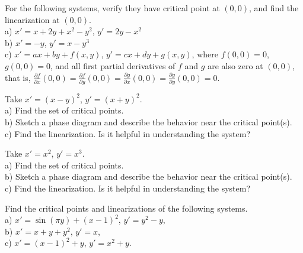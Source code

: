 \begin{exercise}
For the following systems, verify they have critical point at $(0,0)$,
and find the linearization at $(0,0)$.\\
a) $x'=x+2y+x^2-y^2$, $y'=2y-x^2$\\
b) $x'=-y$, $y'=x-y^3$\\
c) $x'=ax+by+f(x,y)$, $y'=cx+dy+g(x,y)$, where
$f(0,0) = 0$,
$g(0,0) = 0$, and all first partial derivatives of $f$ and $g$ are
also zero at $(0,0)$, that is,
$\frac{\partial f}{\partial x}(0,0) = 
\frac{\partial f}{\partial y}(0,0) = 
\frac{\partial g}{\partial x}(0,0) = 
\frac{\partial g}{\partial y}(0,0) = 0$.
\end{exercise}

\begin{exercise}
Take $x'=(x-y)^2$, $y'=(x+y)^2$. \\
a) Find the set of critical points. \\
b) Sketch a phase diagram and describe the behavior near the critical
point(s). \\
c) Find the linearization.  Is it helpful in understanding the system?
\end{exercise}

\begin{exercise}
Take $x'=x^2$, $y'=x^3$. \\
a) Find the set of critical points. \\
b) Sketch a phase diagram and describe the behavior near the critical
point(s). \\
c) Find the linearization.  Is it helpful in understanding the system?
\end{exercise}

\setcounter{exercise}{100}

\begin{exercise}
Find the critical points and linearizations of the following systems.\\
a) $x'=\sin(\pi y)+(x-1)^2$, $y'=y^2-y$,\\
b) $x'=x+y+y^2$, $y'=x$,\\
c) $x'=(x-1)^2+y$, $y'=x^2+y$.
\end{exercise}

